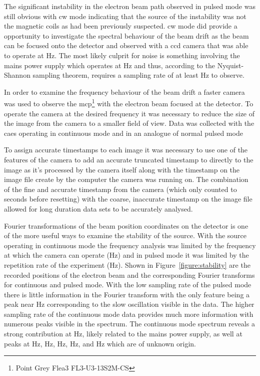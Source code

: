 The significant instability in the electron beam path observed in pulsed mode was still obvious with \gls{cw} mode indicating that the source of the instability was not the magnetic coils as had been previously suspected.
\Gls{cw} mode did provide a opportunity to investigate the spectral behaviour of the beam drift as the beam can be focused onto the detector and observed with a \gls{ccd} camera that was able to operate at \unit[240]{Hz}.
The most likely culprit for noise is something involving the mains power supply which operates at \unit[50]{Hz} and thus, according to the Nyquist-Shannon sampling theorem, requires a sampling rate of at least \unit[100]{Hz} to observe.

In order to examine the frequency behaviour of the beam drift a faster camera was used to observe the \gls{mcp}\footnote{Point Grey Flea3 FL3-U3-13S2M-CS} with the electron beam focused at the detector.
To operate the camera at the desired frequency it was necessary to reduce the size of the image from the camera to a smaller field of view.
Data was collected with the \gls{caes} operating in continuous mode and in an analogue of normal pulsed mode

To assign accurate timestamps to each image it was necessary to use one of the features of the camera to add an accurate truncated timestamp to directly to the image as it's processed by the camera itself along with the timestamp on the image file create by the computer the camera was running on.
The combination of the fine and accurate timestamp from the camera (which only counted to \unit[128]{seconds} before resetting) with the coarse, inaccurate timestamp on the image file allowed for long duration data sets to be accurately analysed.

Fourier transformations of the beam position coordinates on the detector is one of the more useful ways to examine the stability of the source.
With the source operating in continuous mode the frequency analysis was limited by the frequency at which the camera can operate (\unit[240]{Hz}) and in pulsed mode it was limited by the repetition rate of the experiment (\unit[10]{Hz}).
Shown in Figure~\ref{figure:stability} are the recorded positions of the electron beam and the corresponding Fourier transforms for continuous and pulsed mode.
With the low sampling rate of the pulsed mode there is little information in the Fourier transform with the only feature being a peak near \unit[0]{Hz} corresponding to the slow oscillation visible in the data.
The higher sampling rate of the continuous mode data provides much more information with numerous peaks visible in the spectrum.
The continuous mode spectrum reveals a strong contribution at \unit[50]{Hz}, likely related to the mains power supply, as well at peaks at \unit[0]{Hz}, \unit[45]{Hz}, \unit[67]{Hz}, \unit[84]{Hz}, and \unit[92]{Hz} which are of unknown origin.

